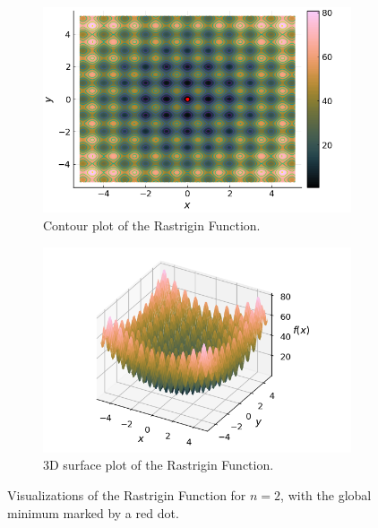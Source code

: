   \begin{figure}[ht!]
    \centering
    \begin{subfigure}[b]{0.45\textwidth}
      \centering
      \includegraphics[width=\textwidth]{img/test_functions/rastrigin_contour.png}
      \caption{Contour plot of the Rastrigin Function.}
      \label{fig:test_functions:rastrigin:contour}
    \end{subfigure}
    \hfill
    \begin{subfigure}[b]{0.45\textwidth}
      \centering
      \includegraphics[width=\textwidth]{img/test_functions/rastrigin_surface.png}
      \caption{3D surface plot of the Rastrigin Function.}
      \label{fig:test_functions:rastrigin:surface}
    \end{subfigure}
    \caption{
      Visualizations of the Rastrigin Function for \(n = 2\), with the global
      minimum marked by a red dot.
    }
    \label{fig:test_functions:rastrigin}
  \end{figure}
